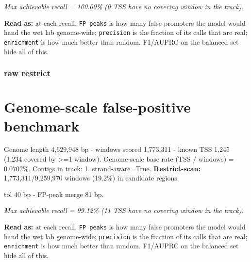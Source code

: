 \documentclass[10pt]{article}
\begin{document}
{\itshape Max achievable recall = 100.00\% (0 TSS have no covering window in the track).}

\textbf{Read as:} at each recall, \texttt{FP peaks} is how many false promoters the model would hand the wet lab genome-wide; \texttt{precision} is the fraction of its calls that are real; \texttt{enrichment} is how much better than random. F1/AUPRC on the balanced set hide all of this.

\subsubsection*{raw \textperiodcentered{} restrict}
\section*{Genome-scale false-positive benchmark}

Genome length 4,629,948 bp - windows scored 1,773,311 - known TSS 1,245 (1,234 covered by >=1 window). Genome-scale base rate (TSS / windows) = 0.0702\%. Contigs in track: 1. strand-aware=True. \textbf{Restrict-scan:} 1,773,311/9,259,970 windows (19.2\%) in candidate regions.

tol 40 bp - FP-peak merge 81 bp.

\begin{center}
\end{center}

{\itshape Max achievable recall = 99.12\% (11 TSS have no covering window in the track).}

\textbf{Read as:} at each recall, \texttt{FP peaks} is how many false promoters the model would hand the wet lab genome-wide; \texttt{precision} is the fraction of its calls that are real; \texttt{enrichment} is how much better than random. F1/AUPRC on the balanced set hide all of this.
\end{document}

